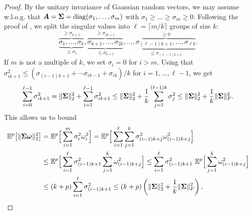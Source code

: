 \begin{proof}
By the unitary invariance of Gaussian random vectors, we may assume w.l.o.g. that $\boldsymbol{A} = \boldsymbol{\Sigma} = \operatorname{diag}(\sigma_1, \dots, \sigma_m)$ with $\sigma_1 \geq \dots \geq \sigma_m \geq 0$.
Following the proof of \cite[Theorem 1]{cohen-2016-optimal-approximate}, we split the singular values into $\ell = \lceil m/k \rceil$ groups of size $k$:
    \begin{equation}
        \overbrace{\underbrace{\sigma_1, \dots, \sigma_k}_{\leq \sigma_1}}^{\geq \sigma_{k+1}}, \overbrace{\underbrace{\sigma_{k+1}, \dots, \sigma_{2k}}_{\leq \sigma_{k+1}}}^{\geq \sigma_{2k+1}}, \dots, \overbrace{\underbrace{\sigma_{(\ell - 1)k + 1}, \dots, \sigma_{\ell k}}_{\leq \sigma_{(\ell - 1)k + 1}}}^{\geq 0}.
    \end{equation}
    If $m$ is not a multiple of $k$, we set $\sigma_i = 0$ for $i > m$. Using that
        $\sigma_{ik + 1}^2 \leq ( \sigma_{(i-1)k + 1} + \cdots \sigma_{ik - 1} + \sigma_{ik} ) / k$ for $i = 1,\ldots, \ell-1$, we get
    \begin{equation}
        \sum_{i=0}^{\ell-1} \sigma_{ik + 1}^2 = \lVert \boldsymbol{\Sigma} \rVert _2^2 + \sum_{i=1}^{\ell-1} \sigma_{ik + 1}^2  \leq \lVert \boldsymbol{\Sigma} \rVert _2^2 + \frac{1}{k} \sum_{j=1}^{(\ell - 1)k} \sigma_j^2 \leq \lVert \boldsymbol{\Sigma} \rVert _2^2 + \frac{1}{k} \lVert \boldsymbol{\Sigma} \rVert _F^2.
        \label{equ:singular-value-group-bound}
    \end{equation}
    This allows us to bound
    \begin{align*}
    \mathbb{E}^{p}\big[ \lVert \mtx{\Sigma} \vct{\omega} \rVert _2^2 \big] & = 
        \mathbb{E}^{p}\Big[ \sum_{i=1}^{m} \sigma_i^2 \omega_i^2 \Big]
        = \mathbb{E}^{p}\Big[ \sum_{i=1}^{\ell} \sum_{j=1}^{k} \sigma_{(i-1)k + j}^2 \omega_{(i-1)k + j}^2 \Big] \\
        &\leq \mathbb{E}^{p}\Big[ \sum_{i=1}^{\ell} \sigma_{(i-1)k + 1}^2 \sum_{j=1}^{k} \omega_{(i-1)k + j}^2 \Big] 
        \leq \sum_{i=1}^{\ell} \sigma_{(i-1)k + 1}^2 ~ \mathbb{E}^{p}\Big[ \sum_{j=1}^{k} \omega_{(i-1)k + j}^2 \Big] \\
        &\leq (k + p) \sum_{i=1}^{\ell} \sigma_{(i-1)k + 1}^2 \leq (k + p) \left( \lVert \mtx{\Sigma} \rVert _2^2 + \frac{1}{k} \lVert \mtx{\Sigma} \rVert _F^2 \right), 

\end{align*}
\end{proof}
